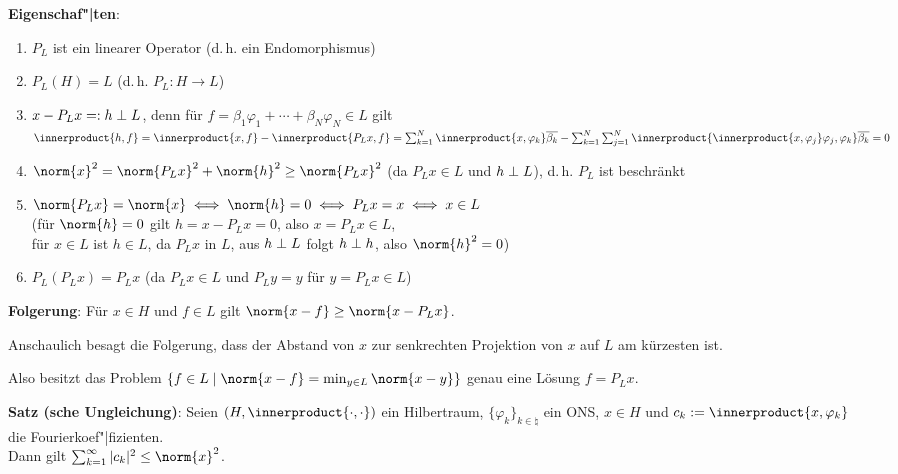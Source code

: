 \textbf{Eigenschaf"|ten}:
\begin{enumerate}
    \item
    $P_L$ ist ein linearer Operator (d.\,h. ein Endomorphismus)

    \item
    $P_L(H) = L$ (d.\,h. $P_L\colon H \rightarrow L$)

    \item
    $x - P_L x =: h \;\bot\; L$,
    denn für $f = \beta_1 \varphi_1 + \dotsb + \beta_N \varphi_N \in L$ gilt\\
    $\innerproduct{h, f} = \innerproduct{x, f} - \innerproduct{P_L x, f} =
    \sum_{k=1}^N \innerproduct{x, \varphi_k} \overline{\beta_k} -
    \sum_{k=1}^N \sum_{j=1}^N \innerproduct{\innerproduct{x, \varphi_j} \varphi_j, \varphi_k}
    \overline{\beta_k} = 0$

    \item
    $\norm{x}^2 = \norm{P_L x}^2 + \norm{h}^2 \ge \norm{P_L x}^2$
    (da $P_L x \in L$ und $h \;\bot\; L$), d.\,h.
    $P_L$ ist beschränkt

    \item
    $\norm{P_L x} = \norm{x} \iff \norm{h} = 0 \iff P_L x = x \iff x \in L$\\
    (für $\norm{h} = 0$ gilt $h = x - P_L x = 0$, also $x = P_L x \in L$,\\
    für $x \in L$ ist $h \in L$, da $P_L x$ in $L$,
    aus $h \;\bot\; L$ folgt $h \;\bot\; h$, also $\norm{h}^2 = 0$)

    \item
    $P_L (P_L x) = P_L x$
    (da $P_L x \in L$ und $P_L y = y$ für $y = P_L x \in L$)
\end{enumerate}

\linie

\textbf{Folgerung}:
Für $x \in H$ und $f \in L$ gilt $\norm{x - f} \ge \norm{x - P_L x}$.

Anschaulich besagt die Folgerung, dass der Abstand von $x$ zur
senkrechten Projektion von $x$ auf $L$ am kürzesten ist.

Also besitzt das Problem $\{f \in L \;|\;
\norm{x - f} = \min_{y \in L} \norm{x - y}\}$ genau eine Lösung
$f = P_L x$.

\textbf{Satz (sche Ungleichung)}:
Seien $(H, \innerproduct{\cdot, \cdot})$ ein Hilbertraum,
$\{\varphi_k\}_{k \in \natural}$ ein ONS,
$x \in H$ und $c_k := \innerproduct{x, \varphi_k}$ die Fourierkoef"|fizienten.\\
Dann gilt $\sum_{k=1}^\infty |c_k|^2 \le \norm{x}^2$.

